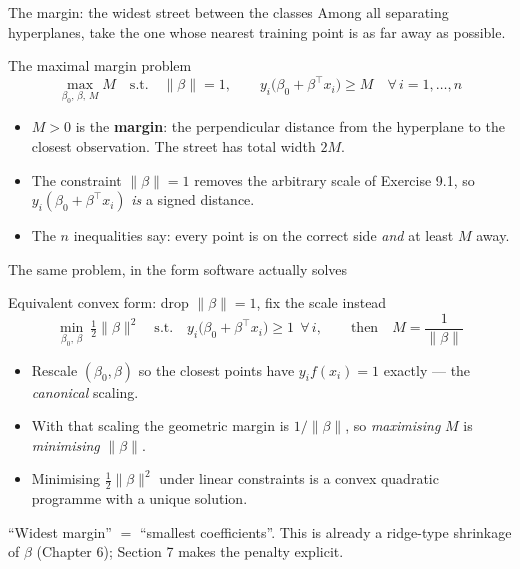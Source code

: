 \documentclass[aspectratio=169,11pt]{beamer}
\begin{document}
\begin{frame}{The margin: the widest street between the classes}
  \footnotesize
  Among all separating hyperplanes, take the one whose nearest training point
  is as far away as possible.
  \begin{block}{The maximal margin problem}
    \[
      \boxed{\;
      \max_{\beta_0,\,\beta,\,M} M
      \quad\text{s.t.}\quad
      \|\beta\| = 1,\qquad
      y_i\big(\beta_0+\beta^\top x_i\big) \ge M \quad \forall\, i=1,\dots,n \;}
    \]
  \end{block}
  \begin{readme}
    \begin{itemize}
      \item $M>0$ is the \textbf{margin}: the perpendicular distance from the
            hyperplane to the closest observation. The street has total width
            $2M$.
      \item The constraint $\|\beta\|=1$ removes the arbitrary scale of
            Exercise 9.1, so $y_i(\beta_0+\beta^\top x_i)$ \emph{is} a signed
            distance.
      \item The $n$ inequalities say: every point is on the correct side
            \emph{and} at least $M$ away.
    \end{itemize}
  \end{readme}
\end{frame}

\begin{frame}{The same problem, in the form software actually solves}
  \footnotesize
  \begin{block}{Equivalent convex form: drop $\|\beta\|=1$, fix the scale instead}
    \[
      \boxed{\;
      \min_{\beta_0,\,\beta}\ \tfrac12\|\beta\|^2
      \quad\text{s.t.}\quad
      y_i\big(\beta_0+\beta^\top x_i\big) \ge 1 \ \ \forall\, i,
      \qquad\text{then}\quad M=\frac{1}{\|\beta\|} \;}
    \]
  \end{block}
  \begin{readme}
    \begin{itemize}
      \item Rescale $(\beta_0,\beta)$ so the closest points have
            $y_i f(x_i)=1$ exactly --- the \emph{canonical} scaling.
      \item With that scaling the geometric margin is $1/\|\beta\|$, so
            \emph{maximising} $M$ is \emph{minimising} $\|\beta\|$.
      \item Minimising $\tfrac12\|\beta\|^2$ under linear constraints is a
            convex quadratic programme with a unique solution.
    \end{itemize}
  \end{readme}
  \begin{takeaway}
    ``Widest margin'' $=$ ``smallest coefficients''. This is already a
    ridge-type shrinkage of $\beta$ (Chapter 6); Section 7 makes the penalty
    explicit.
  \end{takeaway}
\end{frame}
\end{document}
